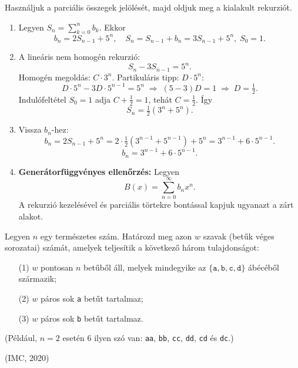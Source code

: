 \begin{solution}
Használjuk a parciális összegek jelölését, majd oldjuk meg a kialakult
rekurziót.
\begin{enumerate}
\item Legyen $S_{n}=\sum_{k=0}^{n}b_{k}$. Ekkor 
\[
b_{n}=2S_{n-1}+5^{n},\quad S_{n}=S_{n-1}+b_{n}=3S_{n-1}+5^{n},\;S_{0}=1.
\]
\item A lineáris nem homogén rekurzió: 
\[
S_{n}-3S_{n-1}=5^{n}.
\]
Homogén megoldás: $C\cdot3^{n}$. Partikuláris tipp: $D\cdot5^{n}$:
\[
D\cdot5^{n}-3D\cdot5^{n-1}=5^{n}\;\Rightarrow\;(5-3)D=1\;\Rightarrow\;D=\tfrac{1}{2}.
\]
Indulófeltétel $S_{0}=1$ adja $C+\tfrac{1}{2}=1$, tehát $C=\tfrac{1}{2}$.
Így 
\[
S_{n}=\tfrac{1}{2}(3^{n}+5^{n}).
\]
\item Vissza $b_{n}$-hez: 
\[
b_{n}=2S_{n-1}+5^{n}=2\cdot\tfrac{1}{2}(3^{n-1}+5^{n-1})+5^{n}=3^{n-1}+6\cdot5^{n-1}.
\]
\[
\boxed{b_{n}=3^{n-1}+6\cdot5^{n-1}.}
\]
\item \textbf{Generátorfüggvényes ellenőrzés:} Legyen 
\[
B(x)=\sum_{n=0}^{\infty}b_{n}x^{n}.
\]
A rekurzió kezelésével és parciális törtekre bontással kapjuk ugyanazt
a zárt alakot. 
\end{enumerate}
\end{solution}
\begin{extraproblem}
Legyen $n$ egy természetes szám. Határozd meg azon $w$ szavak (betűk
véges sorozatai) számát, amelyek teljesítik a következő három tulajdonságot: 
\begin{itemize}
\item[(1)] $w$ pontosan $n$ betűből áll, melyek mindegyike az $\{\texttt{a},\texttt{b},\texttt{c},\texttt{d}\}$
ábécéből származik; 
\item[(2)] $w$ páros sok \texttt{a} betűt tartalmaz; 
\item[(3)] $w$ páros sok \texttt{b} betűt tartalmaz. 
\end{itemize}
\noindent (Például, $n=2$ esetén $6$ ilyen szó van: \texttt{aa},
\texttt{bb}, \texttt{cc}, \texttt{dd}, \texttt{cd} és \texttt{dc}.) 
\begin{flushright}
(IMC, 2020) 
\par\end{flushright}
\end{extraproblem}

